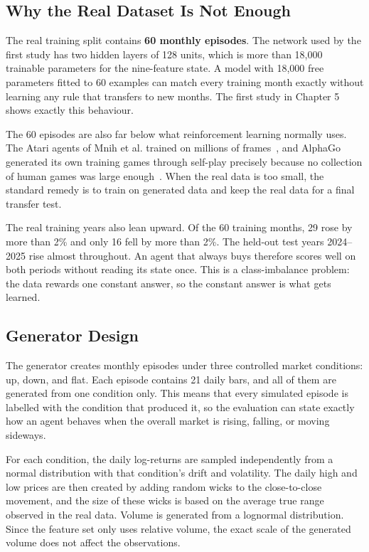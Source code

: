 \subsection{Why the Real Dataset Is Not Enough}

The real training split contains \textbf{60 monthly episodes}. The
network used by the first study has two hidden layers of 128 units,
which is more than 18,000 trainable parameters for the nine-feature
state. A model with 18,000 free parameters fitted to 60 examples can
match every training month exactly without learning any rule that
transfers to new months. The first study in Chapter 5 shows exactly
this behaviour.

The 60 episodes are also far below what reinforcement learning normally
uses. The Atari agents of Mnih et al. trained on millions of frames~\cite{mnih2015},
and AlphaGo generated its own training games through self-play precisely
because no collection of human games was large enough~\cite{silver2016}. When the
real data is too small, the standard remedy is to train on generated
data and keep the real data for a final transfer test.

The real training years also lean upward. Of the 60 training months, 29
rose by more than 2\% and only 16 fell by more than 2\%. The held-out
test years 2024--2025 rise almost throughout. An agent that always buys
therefore scores well on both periods without reading its state once.
This is a class-imbalance problem: the data rewards one constant answer,
so the constant answer is what gets learned.

\subsection{Generator Design}

The generator creates monthly episodes under three controlled market
conditions: up, down, and flat. Each episode contains 21 daily bars,
and all of them are generated from one condition only. This means that
every simulated episode is labelled with the condition that produced
it, so the evaluation can state exactly how an agent behaves when the
overall market is rising, falling, or moving sideways.

For each condition, the daily log-returns are sampled independently
from a normal distribution with that condition's drift and volatility.
The daily high and low prices are then created by adding random wicks
to the close-to-close movement, and the size of these wicks is based on
the average true range observed in the real data. Volume is generated
from a lognormal distribution. Since the feature set only uses relative
volume, the exact scale of the generated volume does not affect the
observations.

